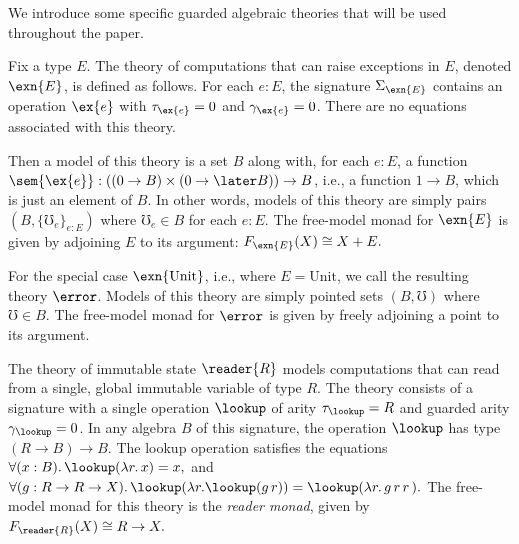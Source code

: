 \documentclass[acmsmall,screen,review,anonymous]{acmart}
\theoremstyle{remark}
\begin{document}
We introduce some specific guarded algebraic theories that will be used
throughout the paper.
%
\begin{example}[Exceptions]\label{ex:exn} Fix a type $E$. The theory of
    computations that can raise exceptions in $E$, denoted $\exn{E}$, is defined
    as follows. For each $e : E$, the signature $\Sigma_{\exn{E}}$ contains an
    operation $\ex{e}$ with $\tau_{\ex{e}} = 0$ and $\gamma_{\ex{e}} = 0$. There
    are no equations associated with this theory.

    Then a model of this theory is a set $B$ along with, for each $e : E$, a
    function $\sem{\ex{e}} : ((0 \to B) \times (0 \to \later B)) \to B$, i.e., a
    function $1 \to B$, which is just an element of $B$. In other words, models
    of this theory are simply pairs $(B, \{ \mho_e \}_{e : E})$ where $\mho_e
    \in B$ for each $e : E$.
    The free-model monad for $\exn{E}$ is given by adjoining $E$ to its
    argument:
    $F_{\exn{E}}(X) \cong X + E.$
    
\end{example}
\begin{example}[Error]\label{ex:err}
    For the special case $\exn{\text{Unit}}$, i.e., where $E = \text{Unit}$, we
    call the resulting theory $\error$. Models of this theory are simply pointed
    sets $(B, \mho)$ where $\mho \in B$. The free-model monad for $\error$ is
    given by freely adjoining a point to its argument.
\end{example}

\begin{example}[Reader]\label{ex:reader} The theory of immutable state
  $\reader{R}$ models computations that can read from a single, global
  immutable variable of type $R$. The theory consists of a signature with a
  single operation $\lookup$ of arity $\tau_\lookup = R$ and guarded arity
  $\gamma_\lookup = 0$. In any algebra $B$ of this signature, the operation
  $\lookup$ has type $(R \to B) \to B$.
  The lookup operation satisfies the equations
  $\forall (x : B).\, \lookup(\lambda r.\, x) = x,$
  and
  $\forall (g : R \to R \to X).\,
    \lookup(\lambda r. \lookup (g\, r)) = \lookup(\lambda r.\, g\, r\, r\,).$
  The free-model monad for this theory is the \emph{reader monad}, given by
  $F_{\reader{R}}(X) \cong R \to X.$
   
\end{example}
\end{document}
